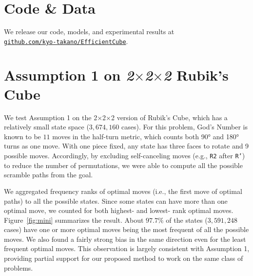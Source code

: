 \documentclass[nohyperref]{article}
\theoremstyle{plain}
\theoremstyle{definition}
\theoremstyle{remark}
\newcommand\rurl[1]{\href{http://#1}{\nolinkurl{#1}}}
\begin{document}
\section*{Code \& Data}
We release our code, models, and experimental results at \\
\rurl{github.com/kyo-takano/EfficientCube}.






\newpage
\appendix
\section{Assumption 1 on \textit{2$\times$2$\times$2} Rubik's Cube}\label{appendix:mini}

We test Assumption 1 on the 2$\times$2$\times$2 version of Rubik's Cube, which has a relatively small state space ($3,674,160$ cases).
For this problem, God's Number is known to be $11$ moves in the half-turn metric, which counts both 90° and 180° turns as one move.
With one piece fixed, any state has three faces to rotate and 9 possible moves.
Accordingly, by excluding self-canceling moves (e.g., \texttt{R2} after \texttt{R'}) to reduce the number of permutations, we were able to compute all the possible scramble paths from the goal.

We aggregated frequency ranks of optimal moves (i.e., the first move of optimal paths) to all the possible states.
Since some states can have more than one optimal move, we counted for both highest- and lowest- rank optimal moves.
Figure~\ref{fig:mini} summarizes the result.
About $97.7\%$ of the states ($3,591,248$ cases) have one or more optimal moves being the most frequent of all the possible moves.
We also found a fairly strong bias in the same direction even for the least frequent optimal moves.
This observation is largely consistent with Assumption 1, providing partial support for our proposed method to work on the same class of problems.
\end{document}
